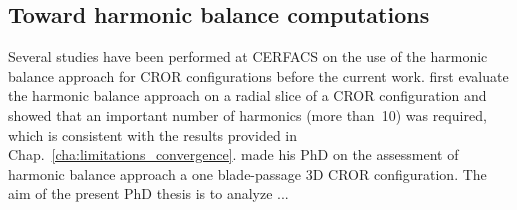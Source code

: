 \subsection*{Toward harmonic balance computations}
\label{sub:toward_harmonic_balance_computations}

Several studies have been performed at CERFACS on the use
of the harmonic balance approach for CROR configurations 
before the current work.
\citet{Yabili2010} first evaluate the harmonic balance approach
on a radial slice of a CROR configuration and showed that an
important number of harmonics (more than~10) was required,
which is consistent with the results provided in 
Chap.~\ref{cha:limitations_convergence}.
\citet{ThesisFrancois} made his PhD on the assessment of
harmonic balance approach a one blade-passage 3D CROR configuration.
The aim of the present PhD thesis is to analyze ...



